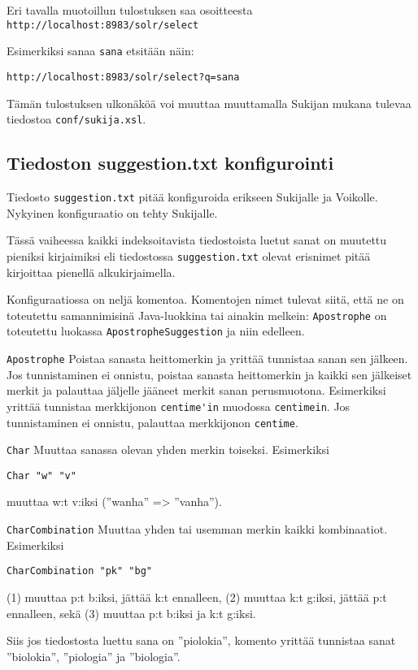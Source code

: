 \documentclass[12pt,a4paper]{scrartcl}
\begin{document}
Eri tavalla muotoillun tulostuksen saa osoitteesta \\
\verb=http://localhost:8983/solr/select=

Esimerkiksi sanaa \verb=sana= etsitään näin:

\verb|http://localhost:8983/solr/select?q=sana|

Tämän tulostuksen ulkonäköä voi muuttaa muuttamalla Sukijan mukana
tulevaa tiedostoa \verb=conf/sukija.xsl=.


\subsection*{Tiedoston suggestion.txt konfigurointi}

Tiedosto \verb|suggestion.txt| pitää konfiguroida erikseen Sukijalle
ja Voikolle. Nykyinen konfiguraatio on tehty Sukijalle.

Tässä vaiheessa kaikki indeksoitavista tiedostoista luetut sanat on
muutettu pieniksi kirjaimiksi eli tiedostossa \verb|suggestion.txt|
olevat erisnimet pitää kirjoittaa pienellä alkukirjaimella.

Konfiguraatiossa on neljä komentoa. Komentojen nimet tulevat siitä,
että ne on toteutettu samannimisinä Java-luokkina tai ainakin melkein:
\verb|Apostrophe| on toteutettu luokassa \verb|ApostropheSuggestion|
ja niin edelleen.

\bigskip
\verb|Apostrophe| Poistaa sanasta heittomerkin ja yrittää tunnistaa
sanan sen jälkeen. Jos tunnistaminen ei onnistu, poistaa sanasta
heittomerkin ja kaikki sen jälkeiset merkit ja palauttaa jäljelle
jääneet merkit sanan perusmuotona. Esimerkiksi yrittää tunnistaa
merkkijonon \verb|centime'in| muodossa \verb|centimein|. Jos
tunnistaminen ei onnistu, palauttaa merkkijonon \verb|centime|.

\bigskip
\verb|Char| Muuttaa sanassa olevan yhden merkin toiseksi. Esimerkiksi

\verb|Char "w" "v"|

muuttaa w:t v:iksi (''wanha'' => ''vanha'').

\bigskip
\verb|CharCombination| Muuttaa yhden tai usemman merkin kaikki
kombinaatiot. Esimerkiksi

\verb|CharCombination "pk" "bg"|

(1) muuttaa p:t b:iksi, jättää k:t ennalleen,
(2) muuttaa k:t g:iksi, jättää p:t ennalleen, sekä
(3) muuttaa p:t b:iksi ja k:t g:iksi.

Siis jos tiedostosta luettu sana on ''piolokia'', komento yrittää
 tunnistaa sanat ''biolokia'', ''piologia'' ja ''biologia''.
\end{document}
